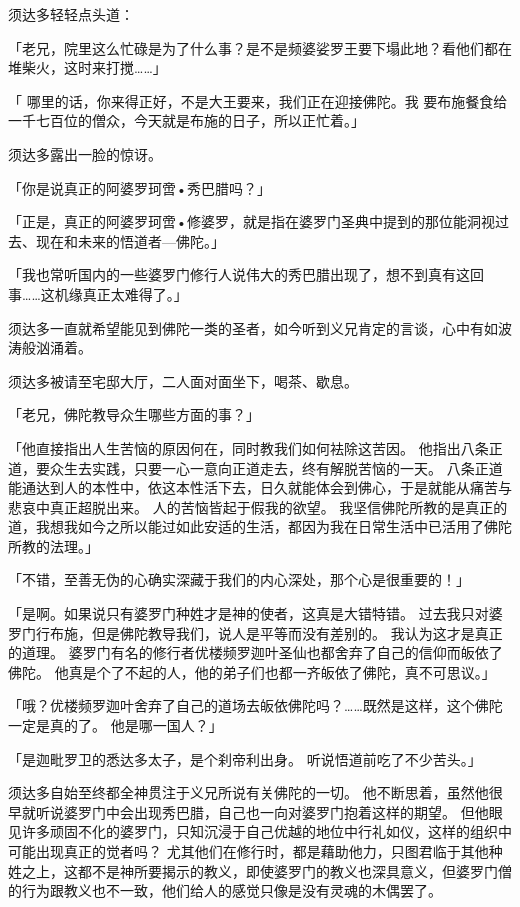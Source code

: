 \documentclass[twoside,openany]{book}
\begin{document}
须达多轻轻点头道：

「老兄，院里这么忙碌是为了什么事？是不是频婆娑罗王要下塌此地？看他们都在堆柴火，这时来打搅……」

「 哪里的话，你来得正好，不是大王要来，我们正在迎接佛陀。我
要布施餐食给一千七百位的僧众，今天就是布施的日子，所以正忙着。」

须达多露出一脸的惊讶。

「你是说真正的阿婆罗珂啻•秀巴腊吗？」

「正是，真正的阿婆罗珂啻•修婆罗，就是指在婆罗门圣典中提到的那位能洞视过去、现在和未来的悟道者---佛陀。」

「我也常听国内的一些婆罗门修行人说伟大的秀巴腊出现了，想不到真有这回事……这机缘真正太难得了。」

须达多一直就希望能见到佛陀一类的圣者，如今听到义兄肯定的言谈，心中有如波涛般汹涌着。

须达多被请至宅邸大厅，二人面对面坐下，喝茶、歇息。

「老兄，佛陀教导众生哪些方面的事？」

「他直接指出人生苦恼的原因何在，同时教我们如何袪除这苦因。
他指出八条正道，要众生去实践，只要一心一意向正道走去，终有解脱苦恼的一天。
八条正道能通达到人的本性中，依这本性活下去，日久就能体会到佛心，于是就能从痛苦与悲哀中真正超脱出来。
人的苦恼皆起于假我的欲望。
我坚信佛陀所教的是真正的道，我想我如今之所以能过如此安适的生活，都因为我在日常生活中已活用了佛陀所教的法理。」

「不错，至善无伪的心确实深藏于我们的内心深处，那个心是很重要的！」

「是啊。如果说只有婆罗门种姓才是神的使者，这真是大错特错。
过去我只对婆罗门行布施，但是佛陀教导我们，说人是平等而没有差别的。
我认为这才是真正的道理。
婆罗门有名的修行者优楼频罗迦叶圣仙也都舍弃了自己的信仰而皈依了佛陀。
他真是个了不起的人，他的弟子们也都一齐皈依了佛陀，真不可思议。」

「哦？优楼频罗迦叶舍弃了自己的道场去皈依佛陀吗？……既然是这样，这个佛陀一定是真的了。
他是哪一国人？」

「是迦毗罗卫的悉达多太子，是个刹帝利出身。
听说悟道前吃了不少苦头。」

须达多自始至终都全神贯注于义兄所说有关佛陀的一切。
他不断思着，虽然他很早就听说婆罗门中会出现秀巴腊，自己也一向对婆罗门抱着这样的期望。
但他眼见许多顽固不化的婆罗门，只知沉浸于自己优越的地位中行礼如仪，这样的组织中可能出现真正的觉者吗？
尤其他们在修行时，都是藉助他力，只图君临于其他种姓之上，这都不是神所要揭示的教义，即使婆罗门的教义也深具意义，但婆罗门僧的行为跟教义也不一致，他们给人的感觉只像是没有灵魂的木偶罢了。
\end{document}
